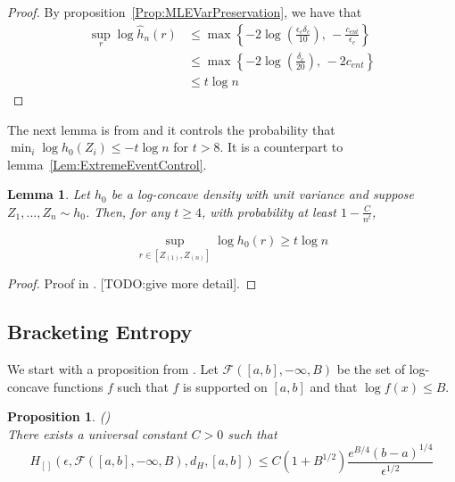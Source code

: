 \documentclass[12pt]{article}
\newtheorem{lemma}[theorem]{Lemma}
\newtheorem{proposition}[theorem]{Proposition}
\begin{document}
\begin{proof}
  
  By proposition~\ref{Prop:MLEVarPreservation}, we have that
  \begin{align*}
    \sup_r \log \hat{h}_n(r) &\leq
                               \max \left\{ - 2 \log \left( \frac{\epsilon_c \delta_c}{10}\right),\, - \frac{c_{ent}}{\epsilon_c} \right\} \\
                             &\leq  \max \left\{ - 2 \log \left( \frac{\delta_c}{20} \right),\, - 2 c_{ent} \right\} \\
                             &\leq t \log n
  \end{align*}
\end{proof}

The next lemma is from \cite{kim2016adaptation} and it controls the probability that $\min_i \log h_0(Z_i) \leq -t \log n$ for $t > 8$. It is a counterpart to lemma~\ref{Lem:ExtremeEventControl}.

\begin{lemma} 
  \label{Lem:ExtremeEventControl2}
  Let $h_0$ be a log-concave density with unit variance and suppose $Z_1,...,Z_n \sim h_0$. Then, for any $t \geq 4$, with probability at least $1 - \frac{C}{n^t}$,

  \[
    \sup_{r \in [Z_{(1)}, Z_{(n)}]} \log h_0(r) \geq t \log n
  \]
  
\end{lemma}

\begin{proof}

  Proof in \cite{kim2016adaptation}. [TODO:give more detail].
  
\end{proof}


\subsection{Bracketing Entropy}

We start with a proposition from \citet{kim2016adaptation}. Let $\mathcal{F}([a,b], -\infty, B)$ be the set of log-concave functions $f$ such that $f$ is supported on $[a,b]$ and that $ \log f(x) \leq B$. 

\begin{proposition} (\citet[Proposition 14]{kim2016adaptation}) \\
There exists a universal constant $C > 0$ such that 
\[
H_{[]}( \epsilon, \mathcal{F}([a,b],-\infty, B), d_H, [a,b]) \leq C( 1 + B^{1/2}) \frac{ e^{B/4} (b-a)^{1/4}}{\epsilon^{1/2}} 
\]
\end{proposition}
\end{document}
